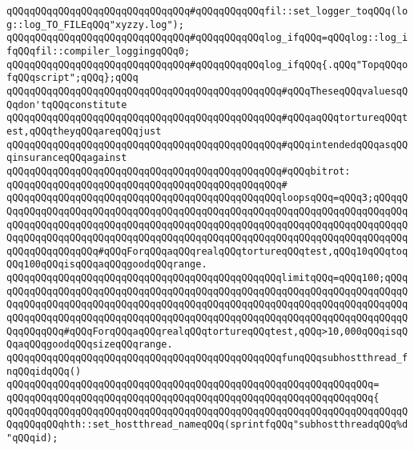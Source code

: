 \verb|qQQqqQQqqQQqqQQqqQQqqQQqqQQqqQQq#qQQqqQQqqQQqfil::set_logger_toqQQq(log::log_TO_FILEqQQq"xyzzy.log");|\newline
\verb|qQQqqQQqqQQqqQQqqQQqqQQqqQQqqQQq#qQQqqQQqqQQqlog_ifqQQq=qQQqlog::log_ifqQQqfil::compiler_loggingqQQq0;|\newline
\verb|qQQqqQQqqQQqqQQqqQQqqQQqqQQqqQQq#qQQqqQQqqQQqlog_ifqQQq{.qQQq"TopqQQqofqQQqscript";qQQq};qQQq|\newline
\newline
\verb|qQQqqQQqqQQqqQQqqQQqqQQqqQQqqQQqqQQqqQQqqQQqqQQq#qQQqTheseqQQqvaluesqQQqdon'tqQQqconstitute|\newline
\verb|qQQqqQQqqQQqqQQqqQQqqQQqqQQqqQQqqQQqqQQqqQQqqQQq#qQQqaqQQqtortureqQQqtest,qQQqtheyqQQqareqQQqjust|\newline
\verb|qQQqqQQqqQQqqQQqqQQqqQQqqQQqqQQqqQQqqQQqqQQqqQQq#qQQqintendedqQQqasqQQqinsuranceqQQqagainst|\newline
\verb|qQQqqQQqqQQqqQQqqQQqqQQqqQQqqQQqqQQqqQQqqQQqqQQq#qQQqbitrot:|\newline
\verb|qQQqqQQqqQQqqQQqqQQqqQQqqQQqqQQqqQQqqQQqqQQqqQQq#|\newline
\verb|qQQqqQQqqQQqqQQqqQQqqQQqqQQqqQQqqQQqqQQqqQQqqQQqloopsqQQq=qQQq3;qQQqqQQqqQQqqQQqqQQqqQQqqQQqqQQqqQQqqQQqqQQqqQQqqQQqqQQqqQQqqQQqqQQqqQQqqQQqqQQqqQQqqQQqqQQqqQQqqQQqqQQqqQQqqQQqqQQqqQQqqQQqqQQqqQQqqQQqqQQqqQQqqQQqqQQqqQQqqQQqqQQqqQQqqQQqqQQqqQQqqQQqqQQqqQQqqQQqqQQqqQQqqQQqqQQqqQQqqQQqqQQqqQQqqQQq#qQQqForqQQqaqQQqrealqQQqtortureqQQqtest,qQQq10qQQqtoqQQq100qQQqisqQQqaqQQqgoodqQQqrange.|\newline
\verb|qQQqqQQqqQQqqQQqqQQqqQQqqQQqqQQqqQQqqQQqqQQqqQQqlimitqQQq=qQQq100;qQQqqQQqqQQqqQQqqQQqqQQqqQQqqQQqqQQqqQQqqQQqqQQqqQQqqQQqqQQqqQQqqQQqqQQqqQQqqQQqqQQqqQQqqQQqqQQqqQQqqQQqqQQqqQQqqQQqqQQqqQQqqQQqqQQqqQQqqQQqqQQqqQQqqQQqqQQqqQQqqQQqqQQqqQQqqQQqqQQqqQQqqQQqqQQqqQQqqQQqqQQqqQQqqQQqqQQqqQQqqQQq#qQQqForqQQqaqQQqrealqQQqtortureqQQqtest,qQQq>10,000qQQqisqQQqaqQQqgoodqQQqsizeqQQqrange.|\newline
\newline
\verb|qQQqqQQqqQQqqQQqqQQqqQQqqQQqqQQqqQQqqQQqqQQqqQQqfunqQQqsubhostthread_fnqQQqidqQQq()|\newline
\verb|qQQqqQQqqQQqqQQqqQQqqQQqqQQqqQQqqQQqqQQqqQQqqQQqqQQqqQQqqQQqqQQq=|\newline
\verb|qQQqqQQqqQQqqQQqqQQqqQQqqQQqqQQqqQQqqQQqqQQqqQQqqQQqqQQqqQQqqQQq{|\newline
\verb|qQQqqQQqqQQqqQQqqQQqqQQqqQQqqQQqqQQqqQQqqQQqqQQqqQQqqQQqqQQqqQQqqQQqqQQqqQQqqQQqhth::set_hostthread_nameqQQq(sprintfqQQq"subhostthreadqQQq%d"qQQqid);|\newline
